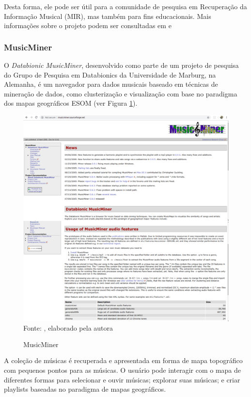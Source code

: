 Desta forma, ele pode ser útil para a comunidade de pesquisa em Recuperação da Informação Musical (MIR), mas também para fins educacionais. Mais informações sobre o projeto podem ser consultadas em \cite{lartillot2007, lartillot2013} e \cite{mirtoolbox}


\subsubsection{MusicMiner} \label{subsec:musicminer}
O \textit{Databionic MusicMiner}, desenvolvido como parte de um projeto de pesquisa do Grupo de Pesquisa em Databionics da Universidade de Marburg, na Alemanha, é um navegador para dados musicais baseado em técnicas de mineração de dados, como clusterização e visualização com base no paradigma dos mapas geográficos ESOM  (ver Figura \ref{fig:musicminer}).

\begin{figure}[!htb]
   \centering
   \caption{MusicMiner}\label{fig:musicminer} 
   \includegraphics[scale=0.2]{figuras/musicminer.png}
   \\Fonte: \cite{musicminer}, elaborado pela autora
\end{figure}

A coleção de músicas é recuperada e apresentada em forma de mapa topográfico com pequenos pontos para as músicas. O usuário pode interagir com o mapa de diferentes formas para selecionar e ouvir músicas; explorar suas músicas; e criar playlists baseadas no paradigma de mapas geográficos.

